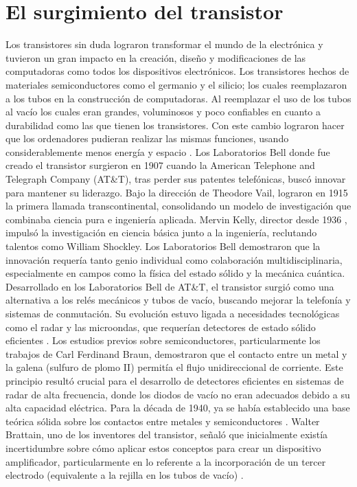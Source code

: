 \documentclass[]{article}
\begin{document}
\section{El surgimiento del transistor}
Los transistores sin duda lograron transformar el mundo de la electrónica y tuvieron un gran impacto en la creación, diseño y modificaciones de las computadoras como todos los dispositivos electrónicos. Los transistores hechos de materiales semiconductores como el germanio y el silicio; los cuales reemplazaron a los tubos en la construcción de computadoras. Al reemplazar el uso de los tubos al vacío los cuales eran grandes, voluminosos y poco confiables en cuanto a durabilidad como las que tienen los transistores. Con este cambio lograron hacer que los ordenadores pudieran realizar las mismas funciones, usando considerablemente menos energía y espacio \cite{braunmacdonald}.
Los Laboratorios Bell donde fue creado el transistor surgieron en 1907 cuando la American Telephone and Telegraph Company (AT\&T), tras perder sus patentes telefónicas, buscó innovar para mantener su liderazgo. Bajo la dirección de Theodore Vail, lograron en 1915 la primera llamada transcontinental, consolidando un modelo de investigación que combinaba ciencia pura e ingeniería aplicada.
Mervin Kelly, director desde 1936 \cite{belllabs}, impulsó la investigación en ciencia básica junto a la ingeniería, reclutando talentos como William Shockley. Los Laboratorios Bell demostraron que la innovación requería tanto genio individual como colaboración multidisciplinaria, especialmente en campos como la física del estado sólido y la mecánica cuántica.
Desarrollado en los Laboratorios Bell de AT\&T, el transistor surgió como una alternativa a los relés mecánicos y tubos de vacío, buscando mejorar la telefonía y sistemas de conmutación. Su evolución estuvo ligada a necesidades tecnológicas como el radar y las microondas, que requerían detectores de estado sólido eficientes \cite{belllabs}.
Los estudios previos sobre semiconductores, particularmente los trabajos de Carl Ferdinand Braun, demostraron que el contacto entre un metal y la galena (sulfuro de plomo II) permitía el flujo unidireccional de corriente. Este principio resultó crucial para el desarrollo de detectores eficientes en sistemas de radar de alta frecuencia, donde los diodos de vacío no eran adecuados debido a su alta capacidad eléctrica. Para la década de 1940, ya se había establecido una base teórica sólida sobre los contactos entre metales y semiconductores \cite{braunmacdonald}.
Walter Brattain, uno de los inventores del transistor, señaló que inicialmente existía incertidumbre sobre cómo aplicar estos conceptos para crear un dispositivo amplificador, particularmente en lo referente a la incorporación de un tercer electrodo (equivalente a la rejilla en los tubos de vacío) \cite{belllabs}.
\end{document}
